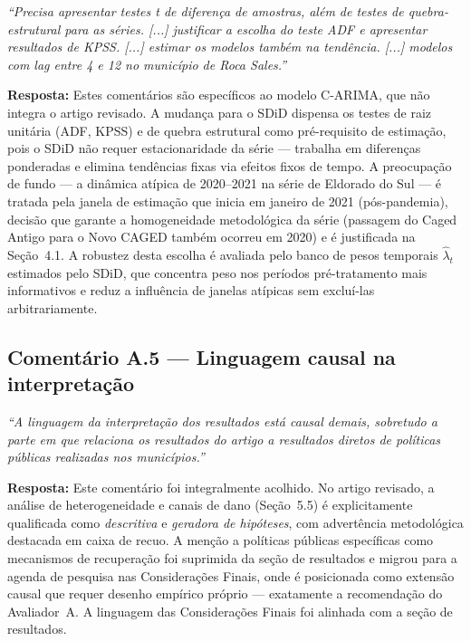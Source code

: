 \documentclass[a4paper,12pt]{article}
\newcommand{\avA}[1]{\textcolor{corA}{\textit{#1}}}
\newcommand{\resposta}[1]{\noindent\textbf{Resposta:} #1}
\begin{document}
\avA{``Precisa apresentar testes t de diferença de amostras, além de testes de
quebra-estrutural para as séries. [...] justificar a escolha do teste ADF e apresentar
resultados de KPSS. [...] estimar os modelos também na tendência. [...] modelos com
lag entre 4 e 12 no município de Roca Sales.''}

\bigskip

\resposta{Estes comentários são específicos ao modelo C-ARIMA, que não integra o artigo
revisado. A mudança para o SDiD dispensa os testes de raiz unitária (ADF, KPSS) e de
quebra estrutural como pré-requisito de estimação, pois o SDiD não requer
estacionaridade da série — trabalha em diferenças ponderadas e elimina tendências
fixas via efeitos fixos de tempo. A preocupação de fundo — a dinâmica atípica de
2020--2021 na série de Eldorado do Sul — é tratada pela janela de estimação que inicia
em janeiro de 2021 (pós-pandemia), decisão que garante a homogeneidade metodológica da
série (passagem do Caged Antigo para o Novo CAGED também ocorreu em 2020) e é
justificada na Seção~4.1. A robustez desta escolha é avaliada pelo banco de pesos
temporais $\hat{\lambda}_t$ estimados pelo SDiD, que concentra peso nos períodos
pré-tratamento mais informativos e reduz a influência de janelas atípicas sem excluí-las
arbitrariamente.}

\bigskip

\subsection*{Comentário A.5 — Linguagem causal na interpretação}

\avA{``A linguagem da interpretação dos resultados está causal demais, sobretudo a parte
em que relaciona os resultados do artigo a resultados diretos de políticas públicas
realizadas nos municípios.''}

\bigskip

\resposta{Este comentário foi integralmente acolhido. No artigo revisado, a análise de
heterogeneidade e canais de dano (Seção~5.5) é explicitamente qualificada como
\textit{descritiva} e \textit{geradora de hipóteses}, com advertência metodológica
destacada em caixa de recuo. A menção a políticas públicas específicas como
mecanismos de recuperação foi suprimida da seção de resultados e migrou para a agenda
de pesquisa nas Considerações Finais, onde é posicionada como extensão causal que
requer desenho empírico próprio — exatamente a recomendação do Avaliador~A. A
linguagem das Considerações Finais foi alinhada com a seção de resultados.}
\end{document}

